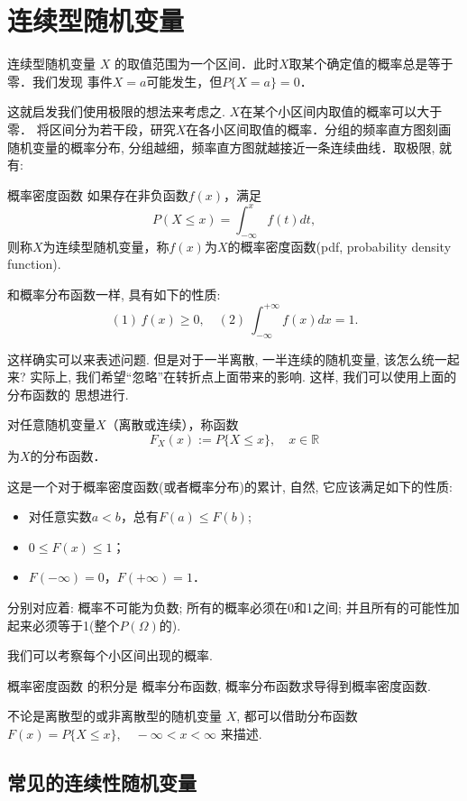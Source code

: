 \section{连续型随机变量}
连续型随机变量 $X$ 的取值范围为一个区间．此时$X$取某个确定值的概率总是等于零．我们发现
事件$X=a$可能发生，但$P\{X=a\}=0$．

这就启发我们使用极限的想法来考虑之. $X$在某个小区间内取值的概率可以大于零．
将区间分为若干段，研究$X$在各小区间取值的概率．分组的频率直方图刻画随机变量的概率分布,
分组越细，频率直方图就越接近一条连续曲线．取极限, 就有:

\begin{definition}{概率密度函数}
    如果存在非负函数$f(x)$，满足
    $$
        P(X\leq x)=\int_{-\infty}^{x}f(t)dt,
    $$
    则称$X$为连续型随机变量，称$f(x)$为$X$的概率密度函数(pdf, probability density function).
\end{definition}

和概率分布函数一样, 具有如下的性质:
$$
    (1)\,f(x)\ge 0,\quad (2)\ \int_{-\infty}^{+\infty}f(x)dx=1.
$$

这样确实可以来表述问题. 但是对于一半离散, 一半连续的随机变量, 该怎么统一起来?
实际上, 我们希望``忽略''在转折点上面带来的影响. 这样, 我们可以使用上面的分布函数的
思想进行.

\begin{definition}
    对任意随机变量$X$（离散或连续），称函数
    $$F_X(x):=P\{X\le x\},\quad x\in \mathbb{R}$$
    为$X$的分布函数．
\end{definition}
这是一个对于概率密度函数(或者概率分布)的累计, 自然, 它应该满足如下的性质:

\begin{itemize}
    \item 对任意实数$a<b$，总有$F(a)\le F(b)$;
    \item $0 \le F(x) \le 1$；
    \item $F(-\infty)=0$，$F(+\infty)=1$．
\end{itemize}
分别对应着: 概率不可能为负数; 所有的概率必须在0和1之间; 并且所有的可能性加起来必须等于1(整个$P(\Omega)$的).
\begin{takeaway}
    我们可以考察每个小区间出现的概率.

    概率密度函数 的积分是 概率分布函数, 概率分布函数求导得到概率密度函数.

    不论是离散型的或非离散型的随机变量 $X$, 都可以借助分布函数$F(x)=P\{X \leqslant x\}, \quad-\infty<x<\infty$
    来描述.
\end{takeaway}
\subsection{常见的连续性随机变量}

